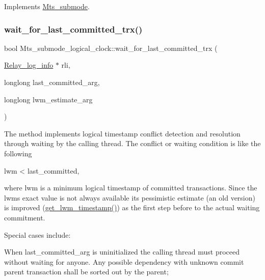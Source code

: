 Implements \mbox{\hyperlink{classMts__submode}{Mts\+\_\+submode}}.

\mbox{\label{classMts__submode__logical__clock_a6f58da5b0597884a11feccf25f3cdc96}} 
\subsubsection{\texorpdfstring{wait\+\_\+for\+\_\+last\+\_\+committed\+\_\+trx()}{wait\_for\_last\_committed\_trx()}}
{\footnotesize\ttfamily bool Mts\+\_\+submode\+\_\+logical\+\_\+clock\+::wait\+\_\+for\+\_\+last\+\_\+committed\+\_\+trx (\begin{DoxyParamCaption}\item[{\mbox{\hyperlink{classRelay__log__info}{Relay\+\_\+log\+\_\+info}} $\ast$}]{rli,  }\item[{longlong}]{last\+\_\+committed\+\_\+arg,  }\item[{longlong}]{lwm\+\_\+estimate\+\_\+arg }\end{DoxyParamCaption})}

The method implements logical timestamp conflict detection and resolution through waiting by the calling thread. The conflict or waiting condition is like the following \begin{DoxyVerb}    lwm < last_committed,
\end{DoxyVerb}


where lwm is a minimum logical timestamp of committed transactions. Since the lwm\textquotesingle{}s exact value is not always available its pessimistic estimate (an old version) is improved (\mbox{\hyperlink{classMts__submode__logical__clock_ac91a392c2d94d6e6045f0ca8f1cbfa00}{get\+\_\+lwm\+\_\+timestamp()}}) as the first step before to the actual waiting commitment.

Special cases include\+:

When {\ttfamily last\+\_\+committed\+\_\+arg} is uninitialized the calling thread must proceed without waiting for anyone. Any possible dependency with unknown commit parent transaction shall be sorted out by the parent;


